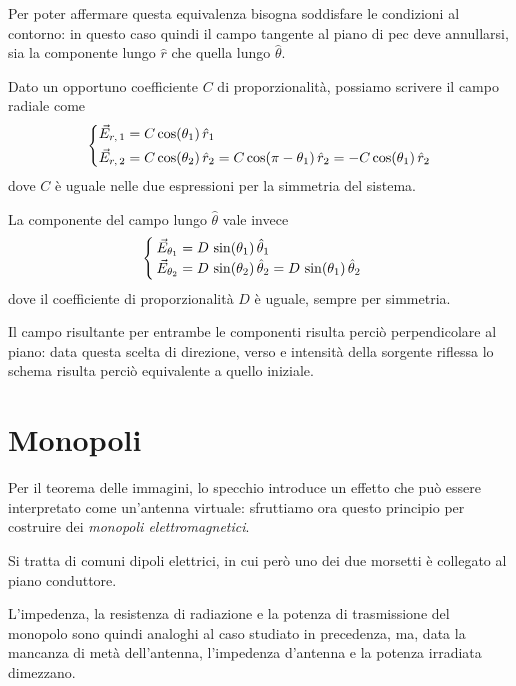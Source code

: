 Per poter affermare questa equivalenza bisogna soddisfare le condizioni al contorno: in questo caso quindi il campo tangente al piano di \gls{pec} deve annullarsi, sia la componente lungo $\hat{r}$ che quella lungo $\hat{\theta}$.

Dato un opportuno coefficiente $C$ di proporzionalità, possiamo scrivere il campo radiale come
\begin{equation}\begin{dcases}
	\vec{E}_{r,\, 1} = C \cos(\theta_1)\,\hat{r}_1 \\
	\vec{E}_{r,\, 2}
	= C \cos(\theta_2)\,\hat{r}_2
	= C \cos(\pi - \theta_1) \,\hat{r}_2
	= -C \cos(\theta_1) \,\hat{r}_2 \\
\end{dcases}\end{equation}
dove $C$ è uguale nelle due espressioni per la simmetria del sistema.

La componente del campo lungo $\hat{\theta}$ vale invece
\begin{equation}\begin{cases}
	\vec{E}_{\theta_1}
	= D \, \sin(\theta_1) \,\hat{\theta}_1 \\
	\vec{E}_{\theta_2}
	= D \, \sin(\theta_2)\,\hat{\theta}_2
	= D \, \sin(\theta_1) \,\hat{\theta}_2 \\
\end{cases}\end{equation}
dove il coefficiente di proporzionalità $D$ è uguale, sempre per simmetria.

Il campo risultante per entrambe le componenti risulta perciò perpendicolare al piano: data questa scelta di direzione, verso e intensità della sorgente riflessa lo schema risulta perciò equivalente a quello iniziale.

\clearpage
\section{Monopoli}

Per il teorema delle immagini, lo specchio introduce un effetto che può essere interpretato come un'antenna virtuale: sfruttiamo ora questo principio per costruire dei \emph{monopoli elettromagnetici}.

Si tratta di comuni dipoli elettrici, in cui però uno dei due morsetti è collegato al piano conduttore.

L'impedenza, la resistenza di radiazione e la potenza di trasmissione del monopolo sono quindi analoghi al caso studiato in precedenza, ma, data la mancanza di metà dell'antenna, l'impedenza d'antenna e la potenza irradiata dimezzano.

